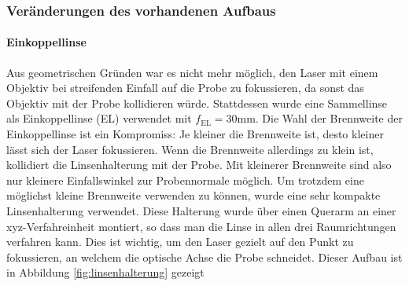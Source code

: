 \documentclass[titlepage]{article}
\begin{document}
	\subsubsection{Veränderungen des vorhandenen Aufbaus}
		\paragraph{Einkoppellinse}
		Aus geometrischen Gründen war es nicht mehr möglich, den Laser mit einem Objektiv bei streifenden Einfall auf die Probe zu fokussieren, da sonst das Objektiv mit der Probe kollidieren würde. Stattdessen wurde eine Sammellinse als Einkoppellinse (EL) verwendet mit $f_{\mathrm{EL}}= 30\mathrm{mm}$. Die Wahl der Brennweite der Einkoppellinse ist ein Kompromiss: Je kleiner die Brennweite ist, desto kleiner lässt sich der Laser fokussieren. Wenn die Brennweite allerdings zu klein ist, kollidiert die Linsenhalterung mit der Probe. Mit kleinerer Brennweite sind also nur kleinere Einfallswinkel zur Probennormale möglich. Um trotzdem eine möglichst kleine Brennweite verwenden zu können, wurde eine sehr kompakte Linsenhalterung verwendet. Diese Halterung wurde über einen Querarm an einer xyz-Verfahreinheit montiert, so dass man die Linse in allen drei Raumrichtungen verfahren kann. Dies ist wichtig, um den Laser gezielt auf den Punkt zu fokussieren, an welchem die optische Achse die Probe schneidet. Dieser Aufbau ist in Abbildung \ref{fig:linsenhalterung} gezeigt
\end{document}
